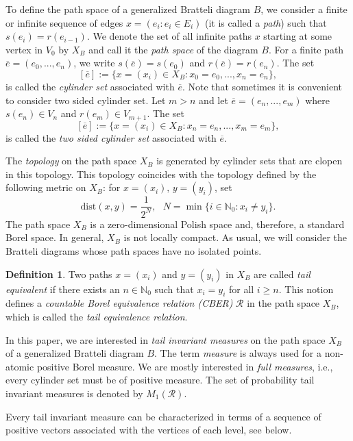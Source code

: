 \documentclass[11pt,reqno]{amsart}
\theoremstyle{definition}
\newtheorem{definition}{Definition}[section]
\theoremstyle{remark}
\theoremstyle{plain}
\def\ol{\overline}
\newcommand{\N}{\mathbb N}
\newcommand{\mc}{\mathcal}
\numberwithin{equation}{section}
\begin{document}
To define the path space of a generalized Bratteli diagram
$B$, we consider a finite or infinite sequence of edges
 $ x = (e_i: e_i\in E_i)$ (it is called a \textit{path}) such 
that $s(e_i)=r(e_{i-1})$. We denote the set of all infinite
paths $x$ starting at some vertex in $V_0$ by $X_B$ and call 
it the \textit{path space} of the diagram $B$. For a finite path
$\ol e = (e_0, ... , e_n)$, we write
$s(\ol e) = s(e_0)$ and $r(\ol e) = r(e_n)$. The set
$$
    [\ol e] := \{x = (x_i) \in X_B : x_0 = e_0, ..., x_n = e_n\}, 
$$ 
is called the \textit{cylinder set} associated with $\ol e$. Note that sometimes it is convenient to consider two sided cylinder set. Let $m > n$ and let $\ol e = (e_n, ... , e_{m})$ where $s(e_n) \in V_n$ and $r(e_{m}) \in V_{m+1}$. The set
$$
[\ol e] := \{x = (x_i) \in X_B : x_n = e_n, ..., x_{m} = e_m\}, 
$$ 
is called the \textit{two sided cylinder set} associated with $\ol e$.

The \textit{topology} on the path space $X_B$ is generated by
cylinder sets that are clopen in this topology.
This topology coincides with the topology defined by the 
following metric on $X_B$: for $x = (x_i), \, y = (y_i)$, set 
$$
\mathrm{dist}(x, y) = \frac{1}{2^N},\ \ \ N = \min\{i \in \N_0 : 
x_i \neq y_i\}.
$$
The path space $X_B$ is a zero-dimensional Polish space and, therefore, a standard Borel space. In general, $X_B$ is not locally compact. As usual, we will consider the Bratteli diagrams whose path spaces have no isolated points.

\begin{definition}\label{Def:Tail_equiv_relation}
Two paths $x= (x_i)$ and $y=(y_i)$ in $X_B$ are called 
\textit{tail equivalent} if there exists an $n \in \mathbb{N}_0$ 
such that $x_i = y_i$ for all $i \geq n$. This notion defines a \textit{countable Borel equivalence relation (CBER)} $\mathcal R$ in the path space $X_B$, which is called the \textit{tail equivalence relation}.
\end{definition}

In this paper, we are interested in  \textit{tail invariant measures}
on the path space $X_B$ of a generalized Bratteli diagram
$B$. The term \textit{measure} is always used for a
non-atomic positive Borel measure. We are mostly 
interested in \textit{full measures}, i.e., every cylinder 
set must be of positive measure. The set of 
probability tail invariant measures is denoted by 
$M_1(\mc R)$.

Every tail invariant measure can be characterized in terms of a sequence of 
positive vectors associated with the vertices of each level, see   below. 
\end{document}
